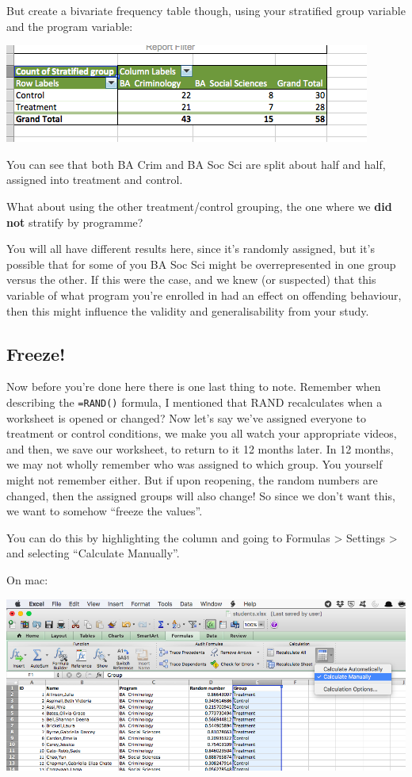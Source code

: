 \documentclass[]{book}
\theoremstyle{definition}
\theoremstyle{definition}
\theoremstyle{definition}
\theoremstyle{remark}
\begin{document}
But create a bivariate frequency table though, using your stratified
group variable and the program variable:

\includegraphics{imgs/biv_prog_tc.png}

You can see that both BA Crim and BA Soc Sci are split about half and
half, assigned into treatment and control.

What about using the other treatment/control grouping, the one where we
\textbf{did not} stratify by programme?

You will all have different results here, since it's randomly assigned,
but it's possible that for some of you BA Soc Sci might be
overrepresented in one group versus the other. If this were the case,
and we knew (or suspected) that this variable of what program you're
enrolled in had an effect on offending behaviour, then this might
influence the validity and generalisability from your study.

\hypertarget{freeze}{%
\subsection{Freeze!}\label{freeze}}

Now before you're done here there is one last thing to note. Remember
when describing the \texttt{=RAND()} formula, I mentioned that RAND
recalculates when a worksheet is opened or changed? Now let's say we've
assigned everyone to treatment or control conditions, we make you all
watch your appropriate videos, and then, we save our worksheet, to
return to it 12 months later. In 12 months, we may not wholly remember
who was assigned to which group. You yourself might not remember either.
But if upon reopening, the random numbers are changed, then the assigned
groups will also change! So since we don't want this, we want to somehow
``freeze the values''.

You can do this by highlighting the column and going to Formulas
\textgreater{} Settings \textgreater{} and selecting ``Calculate
Manually''.

On mac:

\includegraphics{imgs/calc_man.png}
\end{document}
